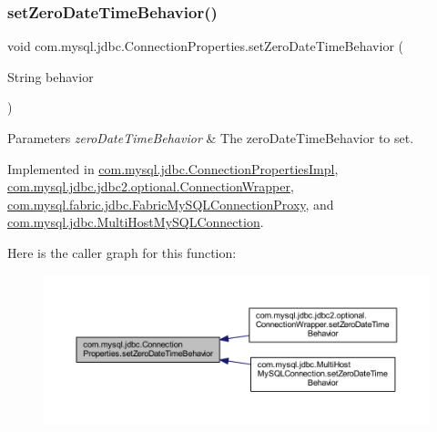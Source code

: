 \subsubsection{\texorpdfstring{set\+Zero\+Date\+Time\+Behavior()}{setZeroDateTimeBehavior()}}
{\footnotesize\ttfamily void com.\+mysql.\+jdbc.\+Connection\+Properties.\+set\+Zero\+Date\+Time\+Behavior (\begin{DoxyParamCaption}\item[{String}]{behavior }\end{DoxyParamCaption})}


\begin{DoxyParams}{Parameters}
{\em zero\+Date\+Time\+Behavior} & The zero\+Date\+Time\+Behavior to set. \\
\hline
\end{DoxyParams}


Implemented in \mbox{\hyperlink{classcom_1_1mysql_1_1jdbc_1_1_connection_properties_impl_a33ad0a39d9fcf2e41a074d50cfe7c226}{com.\+mysql.\+jdbc.\+Connection\+Properties\+Impl}}, \mbox{\hyperlink{classcom_1_1mysql_1_1jdbc_1_1jdbc2_1_1optional_1_1_connection_wrapper_a5514653da00c94961479c2ad44b0cc5f}{com.\+mysql.\+jdbc.\+jdbc2.\+optional.\+Connection\+Wrapper}}, \mbox{\hyperlink{classcom_1_1mysql_1_1fabric_1_1jdbc_1_1_fabric_my_s_q_l_connection_proxy_a12ce8da6b552000f4dbf970c53826785}{com.\+mysql.\+fabric.\+jdbc.\+Fabric\+My\+S\+Q\+L\+Connection\+Proxy}}, and \mbox{\hyperlink{classcom_1_1mysql_1_1jdbc_1_1_multi_host_my_s_q_l_connection_a236306cd02b385607ef0b443508b4f89}{com.\+mysql.\+jdbc.\+Multi\+Host\+My\+S\+Q\+L\+Connection}}.

Here is the caller graph for this function\+:\nopagebreak
\begin{figure}[H]
\begin{center}
\leavevmode
\includegraphics[width=350pt]{interfacecom_1_1mysql_1_1jdbc_1_1_connection_properties_a985e00fab1822f34c53443de78f7f597_icgraph}
\end{center}
\end{figure}
\mbox{\label{interfacecom_1_1mysql_1_1jdbc_1_1_connection_properties_ae9cefafa60524eaec697493db7349cc1}} 
